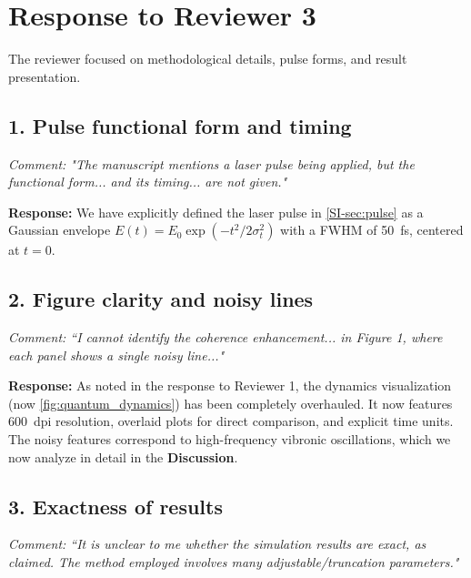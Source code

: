 \documentclass[11pt]{article}
\begin{document}
\vspace{2em}

\section*{Response to Reviewer 3}

The reviewer focused on methodological details, pulse forms, and result presentation.

\subsection*{1. Pulse functional form and timing}

\textit{Comment: "The manuscript mentions a laser pulse being applied, but the functional form... and its timing... are not given."}

\textbf{Response:} We have explicitly defined the laser pulse in \cref{SI-sec:pulse} as a Gaussian envelope $E(t) = E_0 \exp(-t^2/2\sigma_t^2)$ with a FWHM of \SI{50}{\femto\second}, centered at $t=0$.

\subsection*{2. Figure clarity and noisy lines}

\textit{Comment: ``I cannot identify the coherence enhancement... in Figure 1, where each panel shows a single noisy line..."}

\textbf{Response:} As noted in the response to Reviewer 1, the dynamics visualization (now \cref{fig:quantum_dynamics}) has been completely overhauled. It now features \SI{600}{dpi} resolution, overlaid plots for direct comparison, and explicit time units. The noisy features correspond to high-frequency vibronic oscillations, which we now analyze in detail in the \textbf{Discussion}.

\subsection*{3. Exactness of results}

\textit{Comment: ``It is unclear to me whether the simulation results are exact, as claimed. The method employed involves many adjustable/truncation parameters."}
\end{document}
